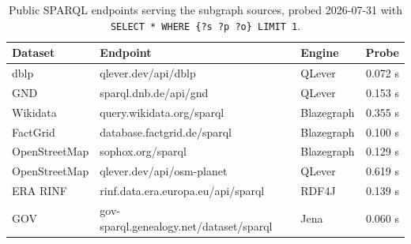 \documentclass[
]{ceurart}
\begin{document}
\begin{table}
\caption{Public SPARQL endpoints serving the subgraph sources, probed
2026-07-31 with \texttt{SELECT * WHERE \{?s ?p ?o\} LIMIT 1}.}
\label{tab:subgraphs}
\begin{tabular}{lllr}
\hline
Dataset       & Endpoint                            & Engine     & Probe \\
\hline
dblp          & qlever.dev/api/dblp                 & QLever     & 0.072 s \\
GND           & sparql.dnb.de/api/gnd               & QLever     & 0.153 s \\
Wikidata      & query.wikidata.org/sparql           & Blazegraph & 0.355 s \\
FactGrid      & database.factgrid.de/sparql         & Blazegraph & 0.100 s \\
OpenStreetMap & sophox.org/sparql                   & Blazegraph & 0.129 s \\
OpenStreetMap & qlever.dev/api/osm-planet           & QLever     & 0.619 s \\
ERA RINF      & rinf.data.era.europa.eu/api/sparql  & RDF4J      & 0.139 s \\
GOV           & gov-sparql.genealogy.net/dataset/sparql & Jena   & 0.060 s \\
\hline
\end{tabular}
\end{table}
\end{document}
